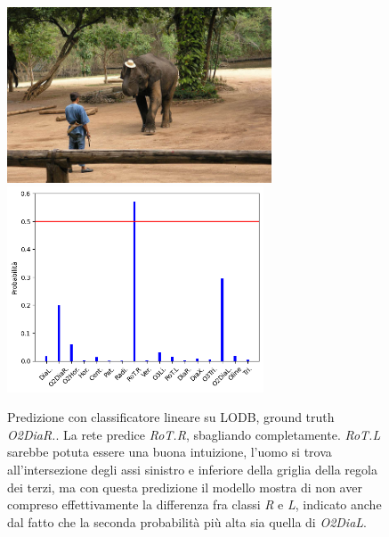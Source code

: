 \begin{figure}[p]
    \centering
    \includegraphics[height=52mm, valign=t]{Immagini/risultati/000000332876_r.jpg}
    \includegraphics[height=61mm, valign=t]{Immagini/risultati/lodb_130_prob.png}
    \caption{Predizione con classificatore lineare su LODB, ground truth \textit{O2DiaR.}. La rete predice \textit{RoT.R}, sbagliando completamente. \textit{RoT.L} sarebbe potuta essere una buona intuizione, l'uomo si trova all'intersezione degli assi sinistro e inferiore della griglia della regola dei terzi, ma con questa predizione il modello mostra di non aver compreso effettivamente la differenza fra classi \textit{R} e \textit{L}, indicato anche dal fatto che la seconda probabilità più alta sia quella di \textit{O2DiaL}.}
    \label{fig:lodb_prob2}
\end{figure}


